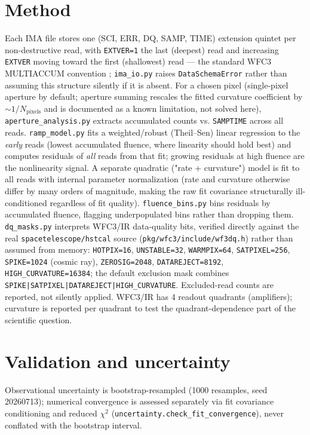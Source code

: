 \documentclass[11pt]{article}
\begin{document}
\section{Method}
Each IMA file stores one (SCI, ERR, DQ, SAMP, TIME) extension quintet per
non-destructive read, with \texttt{EXTVER=1} the last (deepest) read and
increasing \texttt{EXTVER} moving toward the first (shallowest) read --- the
standard WFC3 MULTIACCUM convention \citep{WFC3DataHandbook}; \texttt{ima\_io.py}
raises \texttt{DataSchemaError} rather than assuming this structure silently
if it is absent. For a chosen pixel (single-pixel aperture by default;
aperture summing rescales the fitted curvature coefficient by
$\sim 1/N_{\text{pixels}}$ and is documented as a known limitation, not
solved here), \texttt{aperture\_analysis.py} extracts accumulated counts vs.
\texttt{SAMPTIME} across all reads. \texttt{ramp\_model.py} fits a
weighted/robust (Theil--Sen) linear regression to the \emph{early} reads
(lowest accumulated fluence, where linearity should hold best) and computes
residuals of \emph{all} reads from that fit; growing residuals at high
fluence are the nonlinearity signal. A separate quadratic ("rate + curvature")
model is fit to all reads with internal parameter normalization (rate and
curvature otherwise differ by many orders of magnitude, making the raw fit
covariance structurally ill-conditioned regardless of fit quality).
\texttt{fluence\_bins.py} bins residuals by accumulated fluence, flagging
underpopulated bins rather than dropping them. \texttt{dq\_masks.py}
interprets WFC3/IR data-quality bits, verified directly against the real
\texttt{spacetelescope/hstcal} source (\texttt{pkg/wfc3/include/wf3dq.h})
\citep{HstcalSource} rather than assumed from memory: \texttt{HOTPIX=16},
\texttt{UNSTABLE=32}, \texttt{WARMPIX=64}, \texttt{SATPIXEL=256},
\texttt{SPIKE=1024} (cosmic ray), \texttt{ZEROSIG=2048},
\texttt{DATAREJECT=8192}, \texttt{HIGH\_CURVATURE=16384}; the default
exclusion mask combines \texttt{SPIKE|SATPIXEL|DATAREJECT|HIGH\_CURVATURE}.
Excluded-read counts are reported, not silently applied. WFC3/IR has 4
readout quadrants (amplifiers); curvature is reported per quadrant to test
the quadrant-dependence part of the scientific question.

\section{Validation and uncertainty}
\label{sec:validation}
Observational uncertainty is bootstrap-resampled (1000 resamples, seed
20260713); numerical convergence is assessed separately via fit covariance
conditioning and reduced $\chi^2$
(\texttt{uncertainty.check\_fit\_convergence}), never conflated with the
bootstrap interval.
\end{document}
